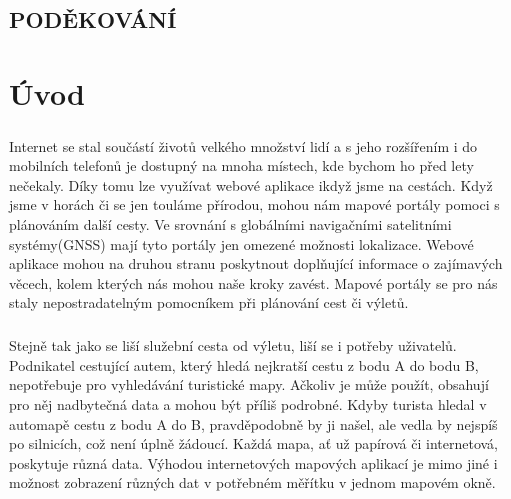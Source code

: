 \documentclass[11pt,a4paper,titlepage,oneside]{book}
\begin{document}
\newpage %
	\vspace*{15cm}
	\section*{\Large PODĚKOVÁNÍ}
	\paragraph{}
		
\renewcommand{\baselinestretch}{1.5} %
\newpage %
\pagestyle{plain}
\setcounter{page}{5}

	\tableofcontents

\newpage %
	\listoffigures

\newpage %
\chapter*{Úvod}
	\paragraph{} Internet se stal součástí životů velkého množství lidí a s jeho rozšířením i do mobilních telefonů je dostupný na mnoha místech, kde bychom ho před lety nečekaly. Díky tomu lze využívat webové aplikace ikdyž jsme na cestách. Když jsme v horách či se jen touláme přírodou, mohou nám mapové portály pomoci s plánováním další cesty. Ve srovnání s globálními navigačními satelitními systémy(GNSS) mají tyto portály jen omezené možnosti lokalizace. Webové aplikace mohou na druhou stranu poskytnout doplňující informace o zajímavých věcech, kolem kterých nás mohou naše kroky zavést. Mapové portály se pro nás staly nepostradatelným pomocníkem při plánování cest či výletů. 
	\paragraph{} Stejně tak jako se liší služební cesta od výletu, liší se i potřeby uživatelů. Podnikatel cestující autem, který hledá nejkratší cestu z bodu A do bodu B, nepotřebuje pro vyhledávání turistické mapy. Ačkoliv je může použít, obsahují pro něj nadbytečná data a mohou být příliš podrobné. Kdyby turista hledal v automapě cestu z bodu A do B, pravděpodobně by ji našel, ale vedla by nejspíš po silnicích, což není úplně žádoucí. Každá mapa, ať už papírová či internetová, poskytuje různá data. Výhodou internetových mapových aplikací je mimo jiné i možnost zobrazení různých dat v potřebném měřítku v jednom mapovém okně.
\end{document}
